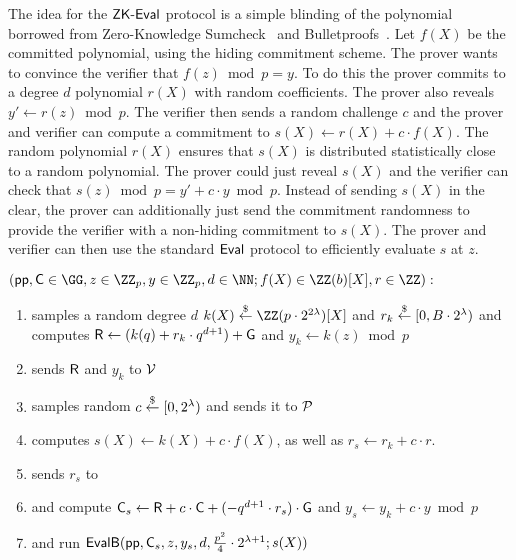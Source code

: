 The idea for the $\textsf{{ZK-Eval}}$ protocol is a simple blinding of the polynomial borrowed from Zero-Knowledge Sumcheck~\cite{EPRINT:ChiForSpo17} and Bulletproofs~\cite{EC:BCCGP16,SP:BBBPWM18}. Let $f(X)$ be the committed polynomial, using the hiding commitment scheme. The prover wants to convince the verifier that $f(z)\bmod p=y$. To do this the prover commits to a degree $d$ polynomial $r(X)$ with random coefficients. The prover also reveals $y'\gets r(z)\bmod p$. The verifier then sends a random challenge $c$ and the prover and verifier can compute a commitment to $s(X)\gets r(X)+c\cdot f(X)$. The random polynomial $r(X)$ ensures that $s(X)$ is distributed statistically close to a random polynomial. The prover could just reveal $s(X)$ and the verifier can check that $s(z)\bmod p=y'+c \cdot y\bmod p$. Instead of sending $s(X)$ in the clear, the prover can additionally just send the commitment randomness to provide the verifier with a non-hiding commitment to $s(X)$. The prover and verifier can then use the standard $\textsf{{Eval}}$ protocol to efficiently evaluate $s$ at $z$.
 \noindent\begin{mdframed}[userdefinedwidth=\textwidth]
\begin{minipage}{\textwidth}
	\begin{flushleft}
	$(\params, \gr{C} \in \GG, z \in \ZZ_p, y \in \ZZ_p, d \in \NN; f(X) \in \ZZ(b)[X], r \in \ZZ):$\\
	\begin{enumerate}[nolistsep]
		    \item \prover samples a random degree $d$ $k(X) \sample \ZZ(p\cdot 2^{2 \lambda})[X]$ and $r_k \overset{\$}{\gets} [0,B\cdot 2^\lambda)$ and computes $\gr{R} \gets (k(q) + r_k \cdot q^{d+1})+\gr{g}$ and $y_k \gets k(z) \bmod p$
		    \item \prover sends $\gr{R}$ and $y_k$ to $\mathcal{V}$
		    \item \verifier samples random $c\overset{\$}{\gets} [0,2^\lambda)$ and sends it to $\mathcal{P}$
		    \item \prover computes $s(X)\gets k(X) + c \cdot f(X)$, as well as $r_s \gets r_k + c\cdot r$.
		    \item \prover sends $r_s$ to \verifier
		    \item \prover and \verifier compute $\gr{C}_s\gets \gr{R} + c\cdot \gr{C} +(-q^{d+1}\cdot r_s)\cdot \gr{g}$ and $y_s\gets y_k+c \cdot y \bmod p$ 
		    \item \prover and \verifier run $\pro{EvalB}(\crs,\gr{C}_s,z,y_s,d,\frac{p^2}{4}\cdot 2^{\lambda+1};s(X))$ 		   		\end{enumerate}
	\end{flushleft}
\end{minipage}
\end{mdframed}

